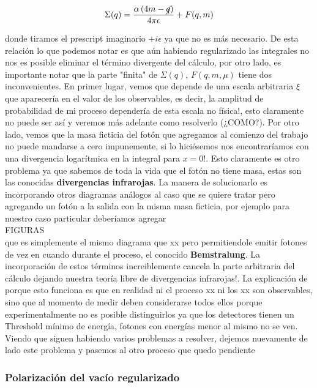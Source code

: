 \documentclass{article}
\numberwithin{equation}{section}
\begin{document}
\begin{equation}\label{key}
\Sigma(q) = \frac{\alpha \left(4m - \cancel{q}\right)}{4\pi \epsilon} + F(q,m)
\end{equation}

donde tiramos el prescript imaginario $ +i\epsilon $ ya que no es más necesario. De esta relación lo que podemos notar es que aún habiendo regularizado las integrales no nos es posible eliminar el término divergente del cálculo, por otro lado, es importante notar que la parte "finita" de $ \Sigma(q) $, $ F(q,m,\mu) $ tiene dos inconvenientes. En primer lugar, vemos que depende de una escala arbitraria $ \xi $ que aparecería en el valor de los observables, es decir, la amplitud de probabilidad de mi proceso dependería de esta escala no física!, esto claramente no puede ser así y veremos más adelante como resolverlo (¿COMO?). Por otro lado, vemos que la masa ficticia del fotón que agregamos al comienzo del trabajo no puede mandarse a cero impunemente, si lo hiciésemos nos encontraríamos con una divergencia logarítmica en la integral para $ x=0 $!. Esto claramente es otro problema ya que sabemos de toda la vida que el fotón no tiene masa, estas son las conocidas \textbf{divergencias infrarojas}. La manera de solucionarlo es incorporando otros diagramas análogos al caso que se quiere tratar pero agregando un fotón a la salida con la misma masa ficticia, por ejemplo para nuestro caso particular deberíamos agregar\\

FIGURAS\\

que es simplemente el mismo diagrama que xx pero permitiendole emitir fotones de vez en cuando durante el proceso, el conocido \textbf{Bemstralung}. La incorporación de estos términos increiblemente cancela la parte arbitraria del cálculo dejando nuestra teoría libre de divergencias infrarojas!. La explicación de porque esto funciona es que en realidad ni el proceso xx ni los xx son observables, sino que al momento de medir deben considerarse todos ellos porque experimentalmente no es posible distinguirlos ya que los detectores tienen un Threshold mínimo de energía, fotones con energías menor al mismo no se ven.\\

Viendo que siguen habiendo varios problemas a resolver, dejemos nuevamente de lado este problema y pasemos al otro proceso que quedo pendiente
  

\subsubsection{Polarización del vacío regularizado}
\end{document}
